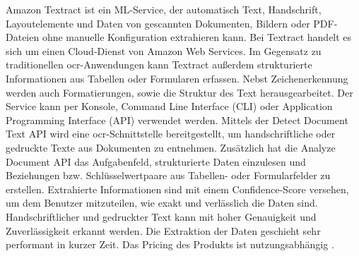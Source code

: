 Amazon Textract ist ein ML-Service, der automatisch Text, Handschrift, Layoutelemente und Daten von gescannten Dokumenten, Bildern oder PDF-Dateien ohne manuelle Konfiguration extrahieren kann. Bei Textract handelt es sich um einen Cloud-Dienst von Amazon Web Services. Im Gegensatz zu traditionellen \gls{ocr}-Anwendungen kann Textract außerdem strukturierte Informationen aus Tabellen oder Formularen erfassen. Nebst Zeichenerkennung werden auch Formatierungen, sowie die Struktur des Text herausgearbeitet. Der Service kann per Konsole, Command Line Interface (CLI) oder Application Programming Interface (API) verwendet werden. Mittels der Detect Document Text API wird eine \gls{ocr}-Schnittstelle bereitgestellt, um handschriftliche oder gedruckte Texte aus Dokumenten zu entnehmen. Zusätzlich hat die Analyze Document API das Aufgabenfeld, strukturierte Daten einzulesen und Beziehungen bzw. Schlüsselwertpaare aus Tabellen- oder Formularfelder zu erstellen. Extrahierte Informationen sind mit einem Confidence-Score versehen, um dem Benutzer mitzuteilen, wie exakt und verlässlich die Daten sind. Handschriftlicher und gedruckter Text kann mit hoher Genauigkeit und Zuverlässigkeit erkannt werden. Die Extraktion der Daten geschieht sehr performant in kurzer Zeit. Das Pricing des Produkts ist nutzungsabhängig \cite{textract}.